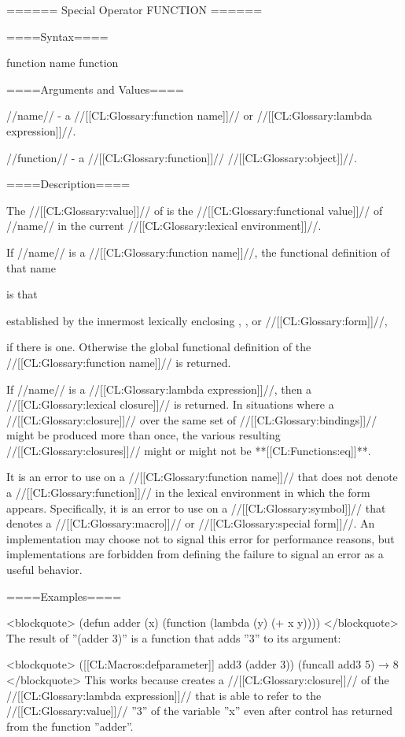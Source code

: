 ====== Special Operator FUNCTION ======

====Syntax====

\DefspecWithValues function {name} {function}

====Arguments and Values====

//name// - a //[[CL:Glossary:function name]]// or //[[CL:Glossary:lambda expression]]//.

//function// - a //[[CL:Glossary:function]]// //[[CL:Glossary:object]]//.

====Description====

The //[[CL:Glossary:value]]// of  is the //[[CL:Glossary:functional value]]// of //name// in the current //[[CL:Glossary:lexical environment]]//.

If //name// is a //[[CL:Glossary:function name]]//, the functional definition of that name

is that

established by the innermost lexically enclosing , , or  //[[CL:Glossary:form]]//,

if there is one. Otherwise the global functional definition of the //[[CL:Glossary:function name]]// is returned.

If //name// is a //[[CL:Glossary:lambda expression]]//, then a //[[CL:Glossary:lexical closure]]// is returned. In situations where a //[[CL:Glossary:closure]]// over the same set of //[[CL:Glossary:bindings]]// might be produced more than once, the various resulting //[[CL:Glossary:closures]]// might or might not be **[[CL:Functions:eq]]**.

It is an error to use  on a //[[CL:Glossary:function name]]// that does not denote a //[[CL:Glossary:function]]// in the lexical environment in which the  form appears. Specifically, it is an error to use  on a //[[CL:Glossary:symbol]]// that denotes a //[[CL:Glossary:macro]]// or //[[CL:Glossary:special form]]//. An implementation may choose not to signal this error for performance reasons, but implementations are forbidden from defining the failure to signal an error as a useful behavior.

====Examples====

<blockquote> (defun adder (x) (function (lambda (y) (+ x y)))) </blockquote> The result of ''(adder 3)'' is a function that adds ''3'' to its argument:

<blockquote> ([[CL:Macros:defparameter]] add3 (adder 3)) (funcall add3 5) → 8 </blockquote> This works because  creates a //[[CL:Glossary:closure]]// of the //[[CL:Glossary:lambda expression]]// that is able to refer to the //[[CL:Glossary:value]]// ''3'' of the variable ''x'' even after control has returned from the function ''adder''.

